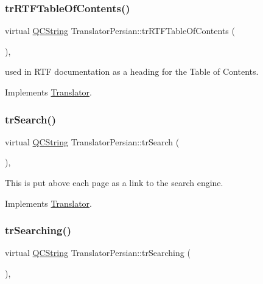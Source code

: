 \mbox{\label{class_translator_persian_a2221609ba5858ee67a5f520a468a1728}} 
\subsubsection{\texorpdfstring{trRTFTableOfContents()}{trRTFTableOfContents()}}
{\footnotesize\ttfamily virtual \mbox{\hyperlink{class_q_c_string}{Q\+C\+String}} Translator\+Persian\+::tr\+R\+T\+F\+Table\+Of\+Contents (\begin{DoxyParamCaption}{ }\end{DoxyParamCaption})\hspace{0.3cm}{\ttfamily [inline]}, {\ttfamily [virtual]}}

used in R\+TF documentation as a heading for the Table of Contents. 

Implements \mbox{\hyperlink{class_translator}{Translator}}.

\mbox{\label{class_translator_persian_a5b1654a5ca3b6e6ab52c2ecc3cbd8389}} 
\subsubsection{\texorpdfstring{trSearch()}{trSearch()}}
{\footnotesize\ttfamily virtual \mbox{\hyperlink{class_q_c_string}{Q\+C\+String}} Translator\+Persian\+::tr\+Search (\begin{DoxyParamCaption}{ }\end{DoxyParamCaption})\hspace{0.3cm}{\ttfamily [inline]}, {\ttfamily [virtual]}}

This is put above each page as a link to the search engine. 

Implements \mbox{\hyperlink{class_translator}{Translator}}.

\mbox{\label{class_translator_persian_a86abda5f0e1ef23e5453801b8260223f}} 
\subsubsection{\texorpdfstring{trSearching()}{trSearching()}}
{\footnotesize\ttfamily virtual \mbox{\hyperlink{class_q_c_string}{Q\+C\+String}} Translator\+Persian\+::tr\+Searching (\begin{DoxyParamCaption}{ }\end{DoxyParamCaption})\hspace{0.3cm}{\ttfamily [inline]}, {\ttfamily [virtual]}}

